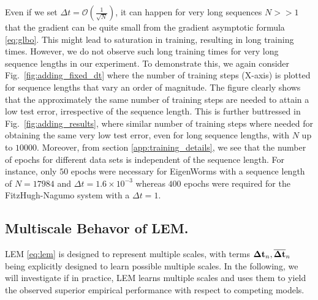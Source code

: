 \documentclass{article} \usepackage{iclr2022_conference,times}
\newcommand{\ord}{{\mathcal O}}
\newcommand{\Dt}{{\Delta t}}
\newcommand{\fref}[1] {Fig.~\ref{#1}}
\begin{document}
Even if we set $\Dt = \ord(\frac{1}{\sqrt{N}})$, it can happen for very long sequences $N>>1$ that the gradient can be quite small from the gradient asymptotic formula \eqref{eq:glbo}. This might lead to saturation in training, resulting in long training times. However, we do not observe such long training times for very long sequence lengths in our experiment. To demonstrate this, we again consider \fref{fig:adding_fixed_dt} where the number of training steps (X-axis) is plotted for sequence lengths that vary an order of magnitude. The figure clearly shows that the approximately the same number of training steps are needed to attain a low test error, irrespective of the sequence length. This is further buttressed in \fref{fig:adding_results}, where similar number of training steps where needed for obtaining the same very low test error, even for long sequence lengths, with $N$ up to $10000$. Moreover, from section \ref{app:training_details}, we see that the number of epochs for different data sets is independent of the sequence length. For instance, only $50$ epochs were necessary for EigenWorms with a sequence length of $N=17984$ and $\Dt = 1.6 \times 10^{-3}$ whereas $400$ epochs were required for the FitzHugh-Nagumo system with a $\Dt =1$. 

\subsection{Multiscale Behavor of LEM.}
\label{app:ms}
LEM \eqref{eq:lem} is designed to represent multiple scales, with terms ${\bf \Dt}_n,\overline{\bf \Dt}_n$ being explicitly designed to learn possible multiple scales. In the following, we will investigate if in practice, LEM learns multiple scales and uses them to yield the observed superior empirical performance with respect to competing models. 
\end{document}
